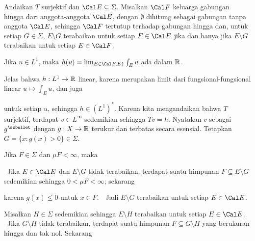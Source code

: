 {\medskip
     
 Andaikan $T$ surjektif dan $\Cal E\subseteq\Sigma$.
Misalkan $\Cal F$ keluarga gabungan hingga dari anggota-anggota
$\Cal E$, dengan $\emptyset$ dihitung sebagai gabungan tanpa anggota
$\Cal E$, sehingga $\Cal F$ tertutup terhadap gabungan hingga dan,
untuk setiap $G\in\Sigma$, $E\setminus G$ terabaikan untuk setiap
$E\in\Cal E$ jika dan hanya jika $E\setminus G$ terabaikan untuk setiap
$E\in\Cal F$.
     
Jika $u\in L^1$, maka
$h(u)=\lim_{E\in\Cal F,E\uparrow}\int_Eu$ ada dalam $\Bbb R$.
     
Jelas bahwa $h:L^1\to\Bbb R$ linear, karena merupakan limit dari
fungsional-fungsional linear $u\mapsto\int_Eu$, dan juga
     
     
\noindent untuk setiap $u$, sehingga $h\in(L^1)^*$.
Karena kita mengandaikan bahwa $T$ surjektif, terdapat
$v\in L^{\infty}$ sedemikian sehingga $Tv=h$. Nyatakan $v$ sebagai
$g^{\ssbullet}$ dengan $g:X\to\Bbb R$ terukur dan terbatas secara
esensial. Tetapkan $G=\{x:g(x)>0\}\in\Sigma$.
     
Jika $F\in\Sigma$ dan $\mu F<\infty$, maka
     
\Quer\ Jika $E\in\Cal E$ dan $E\setminus G$ tidak terabaikan, terdapat
suatu himpunan $F\subseteq E\setminus G$ sedemikian sehingga
$0<\mu F<\infty$; sekarang
     
     
     
\noindent karena $g(x)\le 0$ untuk $x\in F$.\ \BanG\ Jadi
$E\setminus G$ terabaikan untuk setiap $E\in\Cal E$.
     
Misalkan $H\in\Sigma$ sedemikian sehingga $E\setminus H$ terabaikan
untuk setiap $E\in\Cal E$. \Quer\ Jika $G\setminus H$ tidak terabaikan,
terdapat suatu himpunan $F\subseteq G\setminus H$ yang berukuran hingga
dan tak nol. Sekarang
     
     
     
}

